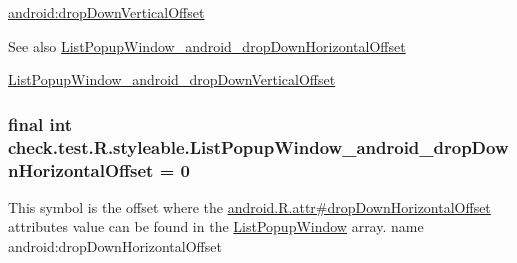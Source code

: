 {\ttfamily \hyperlink{classcheck_1_1test_1_1_r_1_1styleable_acecd6539df16569ba9082b78ed8d0e60}{android\+:drop\+Down\+Vertical\+Offset}}

\begin{DoxySeeAlso}{See also}
\hyperlink{classcheck_1_1test_1_1_r_1_1styleable_a4565a14e8b210c2b611dbd00fdbefbd4}{List\+Popup\+Window\+\_\+android\+\_\+drop\+Down\+Horizontal\+Offset} 

\hyperlink{classcheck_1_1test_1_1_r_1_1styleable_acecd6539df16569ba9082b78ed8d0e60}{List\+Popup\+Window\+\_\+android\+\_\+drop\+Down\+Vertical\+Offset} 
\end{DoxySeeAlso}
\hypertarget{classcheck_1_1test_1_1_r_1_1styleable_a4565a14e8b210c2b611dbd00fdbefbd4}{}
\subsubsection[{List\+Popup\+Window\+\_\+android\+\_\+drop\+Down\+Horizontal\+Offset}]{\setlength{\rightskip}{0pt plus 5cm}final int check.\+test.\+R.\+styleable.\+List\+Popup\+Window\+\_\+android\+\_\+drop\+Down\+Horizontal\+Offset = 0\hspace{0.3cm}{\ttfamily [static]}}\label{classcheck_1_1test_1_1_r_1_1styleable_a4565a14e8b210c2b611dbd00fdbefbd4}
This symbol is the offset where the \hyperlink{}{android.\+R.\+attr\#drop\+Down\+Horizontal\+Offset} attribute\textquotesingle{}s value can be found in the \hyperlink{classcheck_1_1test_1_1_r_1_1styleable_a1d50d8182170e4c2bdda14aea31bd244}{List\+Popup\+Window} array.  name android\+:drop\+Down\+Horizontal\+Offset \hypertarget{classcheck_1_1test_1_1_r_1_1styleable_acecd6539df16569ba9082b78ed8d0e60}{}
